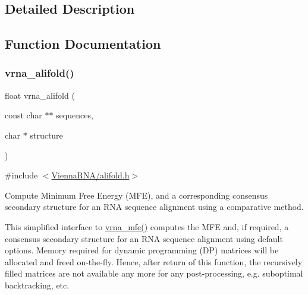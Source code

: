 \subsection{Detailed Description}


\subsection{Function Documentation}
\mbox{\label{group__consensus__mfe__fold_ga6c9d3bef3e92c6d423ffac9f981418c1}} 
\subsubsection{\texorpdfstring{vrna\+\_\+alifold()}{vrna\_alifold()}}
{\footnotesize\ttfamily float vrna\+\_\+alifold (\begin{DoxyParamCaption}\item[{const char $\ast$$\ast$}]{sequences,  }\item[{char $\ast$}]{structure }\end{DoxyParamCaption})}



{\ttfamily \#include $<$\hyperlink{alifold_8h}{Vienna\+R\+N\+A/alifold.\+h}$>$}



Compute Minimum Free Energy (M\+FE), and a corresponding consensus secondary structure for an R\+NA sequence alignment using a comparative method. 

This simplified interface to \hyperlink{group__mfe__fold_gabd3b147371ccf25c577f88bbbaf159fd}{vrna\+\_\+mfe()} computes the M\+FE and, if required, a consensus secondary structure for an R\+NA sequence alignment using default options. Memory required for dynamic programming (DP) matrices will be allocated and free\textquotesingle{}d on-\/the-\/fly. Hence, after return of this function, the recursively filled matrices are not available any more for any post-\/processing, e.\+g. suboptimal backtracking, etc.

